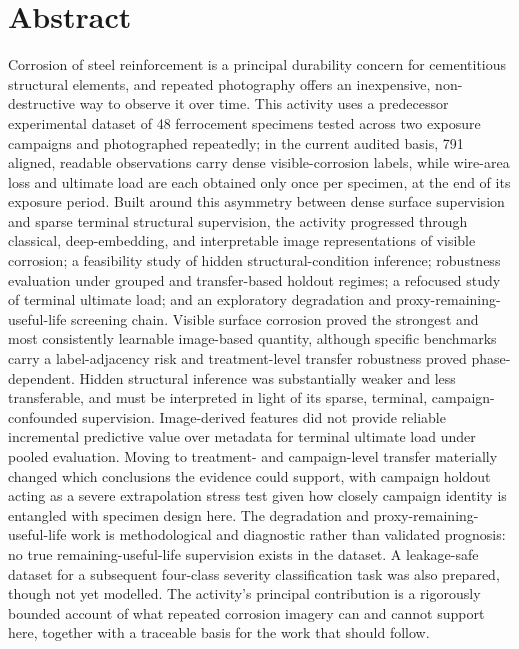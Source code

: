 \chapter*{Abstract}

Corrosion of steel reinforcement is a principal durability concern for
cementitious structural elements, and repeated photography offers an
inexpensive, non-destructive way to observe it over time. This activity
uses a predecessor experimental dataset of 48 ferrocement specimens tested
across two exposure campaigns and photographed repeatedly; in the current
audited basis, 791 aligned, readable observations carry dense
visible-corrosion labels, while wire-area loss and ultimate load are each
obtained only once per specimen, at the end of its exposure period. Built
around this asymmetry between dense surface supervision and sparse
terminal structural supervision, the activity progressed through
classical, deep-embedding, and interpretable image representations of
visible corrosion; a feasibility study of hidden structural-condition
inference; robustness evaluation under grouped and transfer-based holdout
regimes; a refocused study of terminal ultimate load; and an exploratory
degradation and proxy-remaining-useful-life screening chain. Visible
surface corrosion proved the strongest and most consistently learnable
image-based quantity, although specific benchmarks carry a
label-adjacency risk and treatment-level transfer robustness proved
phase-dependent. Hidden structural inference was substantially weaker and
less transferable, and must be interpreted in light of its sparse,
terminal, campaign-confounded supervision. Image-derived features did not
provide reliable
incremental predictive value over metadata for terminal ultimate load
under pooled evaluation. Moving to treatment- and campaign-level transfer
materially changed which conclusions the evidence could support, with
campaign holdout acting as a severe extrapolation stress test given how
closely campaign identity is entangled with specimen design here. The degradation and
proxy-remaining-useful-life work is methodological and diagnostic rather
than validated prognosis: no true remaining-useful-life supervision exists
in the dataset. A leakage-safe dataset for a subsequent four-class
severity classification task was also prepared, though not yet modelled.
The activity's principal contribution is a rigorously bounded account of
what repeated corrosion imagery can and cannot support here, together with
a traceable basis for the work that should follow.
